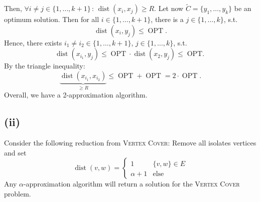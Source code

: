 \documentclass[oneside,a4paper]{amsart}
\begin{document}
Then, $\forall i \neq j \in \{ 1, \ldots, k + 1 \} \, : \, \operatorname{dist}(x_i, x_j) \geq R$.
Let now $\tilde{C} = \{ y_1, \ldots, y_k \}$ be an optimum solution.
Then for all $i \in \{ 1, \ldots, k + 1 \}$, there is a $j \in \{ 1, \ldots, k \}$, s.t.
\[
	\operatorname{dist}(x_i, y_j) \leq \operatorname{OPT}.
\]
Hence, there exists $i_1 \neq i_2 \in \{ 1, \ldots, k + 1\}$, $j \in \{1, \ldots, k\}$, s.t.
\[
	\operatorname{dist}(x_{i_1}, y_j) \leq \operatorname{OPT} \cdot \operatorname{dist}(x_2, y_j) \leq \operatorname{OPT.}
\]
By the triangle inequality:
\[
	\underbrace{ \operatorname{dist}(x_{i_1}, x_{i_2}) }_{\geq R} \leq \operatorname{OPT} + \operatorname{OPT} = 2 \cdot \operatorname{OPT}.
\]
Overall, we have a 2-approximation algorithm.
\subsection*{(ii)}
Consider the following reduction from \textsc{Vertex Cover}: Remove all isolates vertices and set
\[
	\operatorname{dist}(v, w) = \begin{cases}
	1 & \{v, w\} \in E \\
	\alpha + 1 & \text{else}
	\end{cases}
\]
Any $\alpha$-approximation algorithm will return a solution for the \textsc{Vertex Cover} problem.
\end{document}
